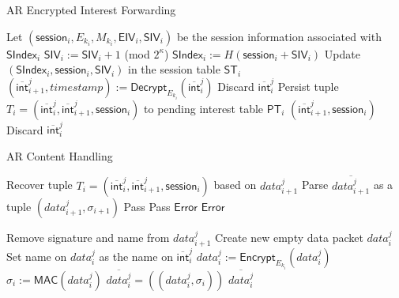 \documentclass[10pt]{article}
\begin{document}
\begin{algorithm}[ht!]
  \caption{AR Encrypted Interest Forwarding}
  \begin{algorithmic}[1]
  \State Let $(\mathsf{session}_i, E_{k_i}, M_{k_i}, \mathsf{EIV}_i, \mathsf{SIV}_i)$ be the session information associated with $\mathsf{SIndex}_i$
  \State $\mathsf{SIV}_i := \mathsf{SIV}_i + 1$ (mod $2^{\kappa}$)
  \State $\mathsf{SIndex}_i := H(\mathsf{session}_i + \mathsf{SIV}_i)$
  \State Update $(\mathsf{SIndex}_i, \mathsf{session}_i, \mathsf{SIV}_i)$ in the session table $\mathsf{ST}_i$
  \State $(\overline{\mathsf{int}}_{i+1}^{j}, timestamp) := \mathsf{Decrypt}_{E_{k_i}}(\overline{\mathsf{int}}_{i}^{j})$
    \State Discard $\overline{\mathsf{int}}_{i}^{j}$
  \Else
    \State Persist tuple $T_i = (\overline{\mathsf{int}}_{i}^{j}, \overline{\mathsf{int}}_{i+1}^{j}, \mathsf{session}_i)$ to pending interest table $\mathsf{PT}_i$
    \State \Return $(\overline{\mathsf{int}}_{i+1}^{j}, \mathsf{session}_i)$
  \EndIf
\Else
  \State Discard $\overline{\mathsf{int}}_{i}^{j}$ 
\EndIf
\end{algorithmic}
\label{alg:enc_int_forward}
\end{algorithm}

\begin{algorithm}[ht!]
  \caption{AR Content Handling}
  \begin{algorithmic}[1]
\State Recover tuple $T_i = (\overline{\mathsf{int}}_{i}^{j}, \overline{\mathsf{int}}_{i+1}^{j}, \mathsf{session}_i)$ based on $data_{i+1}^j$
\State Parse $\overline{data_{i+1}^j}$ as a tuple $(data_{i+1}^j, \sigma_{i+1})$
 
  \State Pass
    \State Pass
  \Else
    \State \Return $\mathsf{Error}$ 
  \EndIf
\Else {}
  \State \Return $\mathsf{Error}$
\EndIf

\State Remove signature and name from $data_{i+1}^j$    
\State Create new empty data packet $data_i^j$
\State Set name on $data_i^j$ as the name on $\overline{\mathsf{int}}_{i}^{j}$
\State $data_i^j := \mathsf{Encrypt}_{E_{k_i}}(data_i^j)$
\State $\sigma_i := \mathsf{MAC}(data_i^j)$
\State $\overline{data_{i}^j} = ((data_i^j, \sigma_i))$
\State \Return $\overline{data_{i}^j}$

\end{algorithmic}
\label{alg:ar_content_handler}
\end{algorithm}
\end{document}
